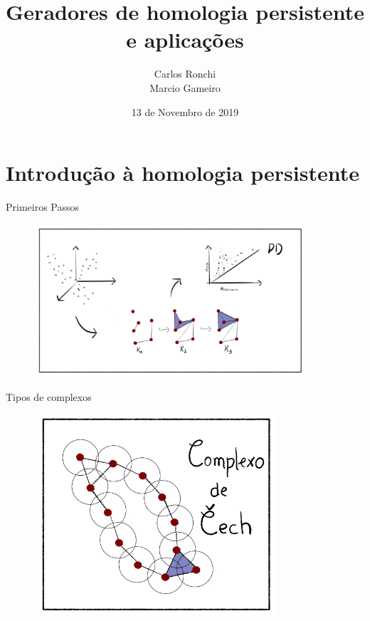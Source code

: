 \documentclass[10pt]{beamer}
\title{Geradores de homologia persistente e aplicações}
\date{13 de Novembro de 2019}
\author{Carlos Ronchi \\
        Marcio Gameiro}
\institute{Universidade de São Paulo}
\begin{document}
\maketitle

\begin{frame}
    \tableofcontents 
\end{frame}

\section{Introdução à homologia persistente}

\begin{frame}{Primeiros Passos}
    \begin{figure}
        \centering
        \includegraphics[width=0.9\textwidth]{images/StepsHomPers.png}
    \end{figure}
\end{frame}

\begin{frame}{Tipos de complexos}
    \begin{figure}
        \centering
        \includegraphics[width=0.8\textwidth]{../images/ComplexCech.png}
    \end{figure}   
\end{frame}
\end{document}
